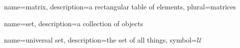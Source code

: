 {name={matrix},%
 description={a rectangular table of elements},%
 plural={matrices}%
} 

{%
  name={set},%
  description={a collection of objects}%
} 

{%
  name={universal set},%
  description={the set of all things},%
  symbol={\ensuremath{\mathcal{U}}}%
} 


